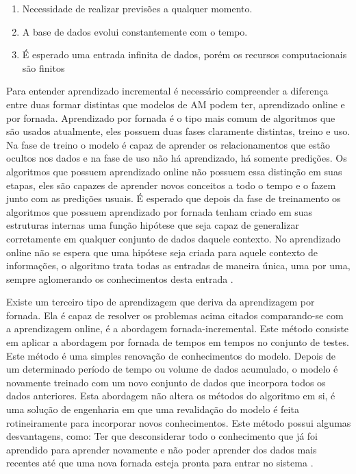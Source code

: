 \begin{enumerate}
\item Necessidade de realizar previsões a qualquer momento.
\item A base de dados evolui constantemente com o tempo.
\item É esperado uma entrada infinita de dados, porém os recursos computacionais são finitos
\end{enumerate}

Para entender aprendizado incremental é necessário compreender a diferença entre duas formar distintas que modelos de AM podem ter, aprendizado online e por fornada. Aprendizado por fornada é o tipo mais comum de algoritmos que são usados atualmente, eles possuem duas fases claramente distintas, treino e uso. Na fase de treino o modelo é capaz de aprender os relacionamentos que estão ocultos nos dados e na fase de uso não há aprendizado, há somente predições. Os algoritmos que possuem aprendizado online não possuem essa distinção em suas etapas, eles são capazes de aprender novos conceitos a todo o tempo e o fazem junto com as predições usuais. É esperado que depois da fase de treinamento os algoritmos que possuem aprendizado por fornada tenham criado em suas estruturas internas uma função hipótese que seja capaz de generalizar corretamente em qualquer conjunto de dados daquele contexto. No aprendizado online não se espera que uma hipótese seja criada para aquele contexto de informações, o algoritmo trata todas as entradas de maneira única, uma por uma, sempre aglomerando os conhecimentos desta entrada \cite{from2009}. 

Existe um terceiro tipo de aprendizagem que deriva da aprendizagem por fornada. Ela é capaz de resolver os problemas acima citados comparando-se com a aprendizagem online, é a abordagem fornada-incremental. Este método consiste em aplicar a abordagem por fornada de tempos em tempos no conjunto de testes. Este método é uma simples renovação de conhecimentos do modelo. Depois de um determinado período de tempo ou volume de dados acumulado, o modelo é novamente treinado com um novo conjunto de dados que incorpora todos os dados anteriores. Esta abordagem não altera os métodos do algoritmo em si, é uma solução de engenharia em que uma revalidação do modelo é feita rotineiramente para incorporar novos conhecimentos. Este método possui algumas desvantagens, como: Ter que desconsiderar todo o conhecimento que já foi aprendido para aprender novamente e não poder aprender dos dados mais recentes até que uma nova fornada esteja pronta para entrar no sistema \cite{batch2013}.

